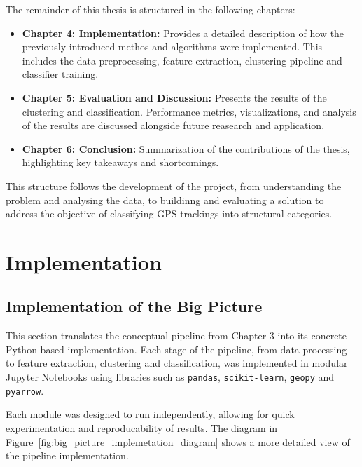 \documentclass[a4paper,12pt,twoside]{scrreprt}
\begin{document}
The remainder of this thesis is structured in the following chapters:

\begin{itemize}
  \item \textbf{Chapter 4: Implementation:} Provides a detailed description of
        how the previously introduced methos and algorithms were implemented.
        This
        includes the data preprocessing, feature extraction, clustering
        pipeline and
        classifier training.
  \item \textbf{Chapter 5: Evaluation and Discussion:} Presents the results of
        the clustering and classification. Performance metrics, visualizations,
        and
        analysis of the results are discussed alongside future reasearch and
        application.
  \item \textbf{Chapter 6: Conclusion:} Summarization of the contributions of
        the thesis, highlighting key takeaways and shortcomings.
\end{itemize}

This structure follows the development of the project, from understanding the
problem and analysing the data, to buildinng and evaluating a solution to
address the objective of classifying GPS trackings into structural categories.
\chapter{Implementation}


\section{Implementation of the Big Picture}

This section translates the conceptual pipeline from Chapter 3 into its
concrete Python-based implementation.
Each stage of the pipeline, from data processing to feature extraction,
clustering and classification, was implemented in modular Jupyter Notebooks
using libraries such as \texttt{pandas}, \texttt{scikit-learn}, \texttt{geopy}
and \texttt{pyarrow}.

Each module was designed to run independently, allowing for quick
experimentation and reproducability of results. The diagram in
Figure~\ref{fig:big_picture_implemetation_diagram} shows a more detailed view
of the pipeline implementation.
\end{document}
